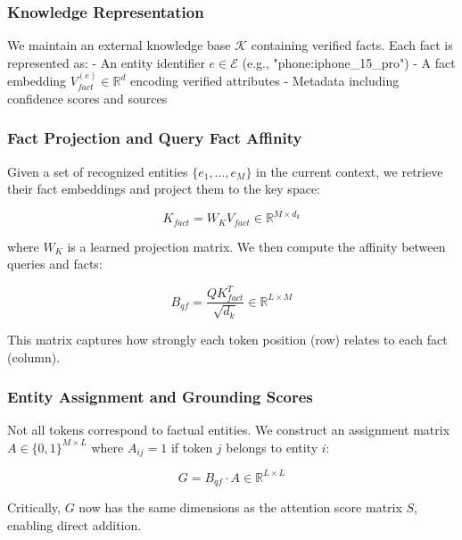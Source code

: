 \documentclass[11pt, a4paper]{article}
\theoremstyle{definition}
\newcommand{\R}{\mathbb{R}}
\begin{document}
\subsubsection{Knowledge Representation}

We maintain an external knowledge base $\mathcal{K}$ containing verified facts. Each fact is represented as:
- An entity identifier $e \in \mathcal{E}$ (e.g., "phone:iphone\_15\_pro")
- A fact embedding $V_{fact}^{(e)} \in \R^{d}$ encoding verified attributes
- Metadata including confidence scores and sources

\subsubsection{Fact Projection and Query Fact Affinity}

Given a set of recognized entities $\{e_1, ..., e_M\}$ in the current context, we retrieve their fact embeddings and project them to the key space:

\begin{equation}
K_{fact} = W_K V_{fact} \in \R^{M \times d_k}
\end{equation}

where $W_K$ is a learned projection matrix. We then compute the affinity between queries and facts:

\begin{equation}
B_{qf} = \frac{QK_{fact}^T}{\sqrt{d_k}} \in \R^{L \times M}
\end{equation}

This matrix captures how strongly each token position (row) relates to each fact (column).

\subsubsection{Entity Assignment and Grounding Scores}

Not all tokens correspond to factual entities. We construct an assignment matrix $A \in \{0,1\}^{M \times L}$ where $A_{ij} = 1$ if token $j$ belongs to entity $i$:

\begin{equation}
G = B_{qf} \cdot A \in \R^{L \times L}
\end{equation}

Critically, $G$ now has the same dimensions as the attention score matrix $S$, enabling direct addition.
\end{document}
